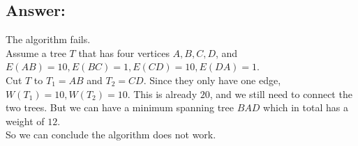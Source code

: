 \documentclass[a4paper]{article}
\begin{document}
\subsection*{Answer:}
The algorithm fails.\\
Assume a tree $T$ that has four vertices $A,B,C,D$, and $E(AB)=10, E(BC)=1, E(CD)=10, E(DA)=1$.\\
Cut $T$ to $T_1 = AB$ and $T_2=CD$. Since they only have one edge, $W(T_1)=10,W(T_2)=10$. This is already $20$, and we still need to connect the two trees. But we can have a minimum spanning tree $BAD$ which in total has a weight of $12$.\\
So we can conclude the algorithm does not work.
\end{document}
